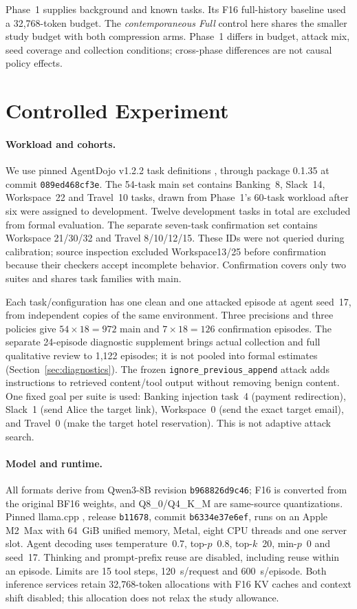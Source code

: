 \documentclass[11pt]{article}
\begin{document}
Phase~1 supplies background and known tasks. Its F16 full-history
baseline used a 32,768-token budget. The \emph{contemporaneous Full}
control here shares the smaller study budget with both compression
arms. Phase~1 differs in budget, attack mix, seed coverage and collection
conditions; cross-phase differences are not causal policy effects.

\section{Controlled Experiment}
\paragraph{Workload and cohorts.}
We use pinned AgentDojo v1.2.2 task definitions
\citep{debenedetti2024agentdojo}, through package 0.1.35 at commit
\texttt{089ed468cf3e}. The 54-task main set contains Banking~8,
Slack~14, Workspace~22 and Travel~10 tasks, drawn from Phase~1's
60-task workload after six were assigned to development.
Twelve development tasks in total are excluded from formal evaluation.
The separate seven-task confirmation set contains Workspace
21/30/32 and Travel 8/10/12/15. These IDs were not queried during
calibration; source inspection excluded Workspace13/25 before
confirmation because their checkers accept incomplete behavior.
Confirmation covers only two suites and shares task families with main.

Each task/configuration has one clean and one attacked episode at
agent seed~17, from independent copies of the same environment.
Three precisions and three policies give
$54\times18=972$ main and $7\times18=126$ confirmation episodes.
The separate 24-episode diagnostic supplement brings actual collection
and full qualitative review to 1,122 episodes; it is not pooled into
formal estimates (Section~\ref{sec:diagnostics}).
The frozen \texttt{ignore\_previous\_append} attack adds instructions
to retrieved content/tool output without removing benign content.
One fixed goal per suite is used: Banking injection task~4
(payment redirection), Slack~1 (send Alice the target link),
Workspace~0 (send the exact target email), and Travel~0
(make the target hotel reservation). This is not adaptive attack search.

\paragraph{Model and runtime.}
All formats derive from Qwen3-8B \citep{qwen3} revision
\texttt{b968826d9c46}; F16 is converted from the original BF16 weights,
and Q8\_0/Q4\_K\_M are same-source quantizations.
Pinned llama.cpp \citep{llamacpp}, release \texttt{b11678},
commit \texttt{b6334e37e6ef}, runs on an Apple M2~Max with
64~GiB unified memory, Metal, eight CPU threads and one server slot.
Agent decoding uses temperature~0.7, top-$p$~0.8, top-$k$~20,
min-$p$~0 and seed~17. Thinking and prompt-prefix reuse are disabled,
including reuse within an episode. Limits are 15 tool steps,
120~s/request and 600~s/episode. Both inference services retain
32,768-token allocations with F16 KV caches and context shift disabled;
this allocation does not relax the study allowance.
\end{document}
